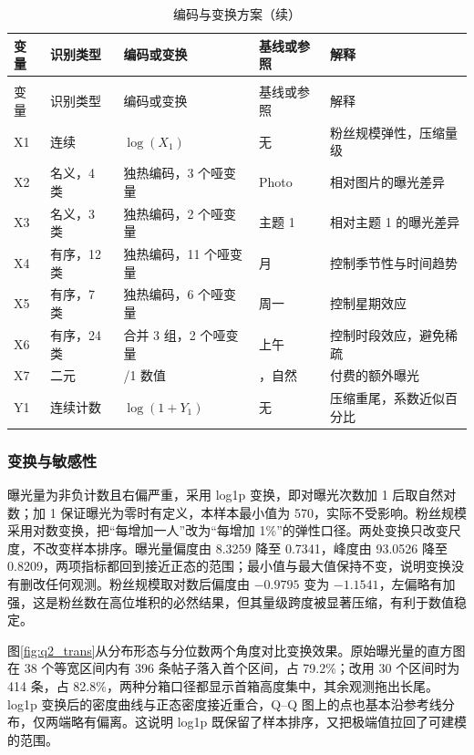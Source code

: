 \begin{longtable}{>{\centering\arraybackslash}p{}>{\centering\arraybackslash}p{}>{\centering\arraybackslash}p{}>{\centering\arraybackslash}p{}>{\centering\arraybackslash}p{}}
  \caption{编码与变换方案}
  \label{tab:q2_scheme} \\
  \toprule
  变量 & 识别类型 & 编码或变换 & 基线或参照 & 解释 \\
  \midrule
  \endfirsthead
  \caption{编码与变换方案（续）} \\
  \toprule
  变量 & 识别类型 & 编码或变换 & 基线或参照 & 解释 \\
  \midrule
  \endhead
  \bottomrule
  \endfoot
  X1 & 连续 & $\log(X_1)$ & 无 & 粉丝规模弹性，压缩量级 \\
  X2 & 名义，4 类 & 独热编码，3 个哑变量 & Photo & 相对图片的曝光差异 \\
  X3 & 名义，3 类 & 独热编码，2 个哑变量 & 主题 1 & 相对主题 1 的曝光差异 \\
  X4 & 有序，12 类 & 独热编码，11 个哑变量 & 1 月 & 控制季节性与时间趋势 \\
  X5 & 有序，7 类 & 独热编码，6 个哑变量 & 周一 & 控制星期效应 \\
  X6 & 有序，24 类 & 合并 3 组，2 个哑变量 & 上午 & 控制时段效应，避免稀疏 \\
  X7 & 二元 & 0/1 数值 & 0，自然 & 付费的额外曝光 \\
  Y1 & 连续计数 & $\log(1+Y_1)$ & 无 & 压缩重尾，系数近似百分比 \\
\end{longtable}

\subsubsection{变换与敏感性}

曝光量为非负计数且右偏严重，采用 log1p 变换，即对曝光次数加 1 后取自然对数；加 1 保证曝光为零时有定义，本样本最小值为 570，实际不受影响。粉丝规模采用对数变换，把“每增加一人”改为“每增加 1\%”的弹性口径。两处变换只改变尺度，不改变样本排序。曝光量偏度由 8.3259 降至 0.7341，峰度由 93.0526 降至 0.8209，两项指标都回到接近正态的范围；最小值与最大值保持不变，说明变换没有删改任何观测。粉丝规模取对数后偏度由 $-0.9795$ 变为 $-1.1541$，左偏略有加强，这是粉丝数在高位堆积的必然结果，但其量级跨度被显著压缩，有利于数值稳定。

图\ref{fig:q2_trans}从分布形态与分位数两个角度对比变换效果。原始曝光量的直方图在 38 个等宽区间内有 396 条帖子落入首个区间，占 79.2\%；改用 30 个区间时为 414 条，占 82.8\%，两种分箱口径都显示首箱高度集中，其余观测拖出长尾。log1p 变换后的密度曲线与正态密度接近重合，Q--Q 图上的点也基本沿参考线分布，仅两端略有偏离。这说明 log1p 既保留了样本排序，又把极端值拉回了可建模的范围。


